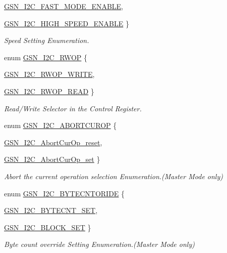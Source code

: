 \begin{DoxyCompactItemize}
\hyperlink{a00649_gga75fb1bfd3b52d6ceab35ff62418c6bf6a17def2de96abbf935f2575540969c799}{GSN\_\-I2C\_\-FAST\_\-MODE\_\-ENABLE}, 
\par
\hyperlink{a00649_gga75fb1bfd3b52d6ceab35ff62418c6bf6a1e00b42818c99439a7fc786bba97884f}{GSN\_\-I2C\_\-HIGH\_\-SPEED\_\-ENABLE}
 \}
\begin{DoxyCompactList}\small\item\em Speed Setting Enumeration. \end{DoxyCompactList}\item 
enum \hyperlink{a00649_ga67da6f46815f1aaf8cf6e1a35b13a02c}{GSN\_\-I2C\_\-RWOP} \{ \par
\hyperlink{a00649_gga67da6f46815f1aaf8cf6e1a35b13a02ca05670c9dbe8177c6b8181687371252b8}{GSN\_\-I2C\_\-RWOP\_\-WRITE}, 
\par
\hyperlink{a00649_gga67da6f46815f1aaf8cf6e1a35b13a02ca06637fe79ea8edf62c203c11c2cca718}{GSN\_\-I2C\_\-RWOP\_\-READ}
 \}
\begin{DoxyCompactList}\small\item\em Read/Write Selector in the Control Register. \end{DoxyCompactList}\item 
enum \hyperlink{a00649_ga2ed0e9ed554e26759140e9afffd51eb4}{GSN\_\-I2C\_\-ABORTCUROP} \{ \par
\hyperlink{a00649_gga2ed0e9ed554e26759140e9afffd51eb4ac5cf33d09a8a21ee470a61827adee434}{GSN\_\-I2C\_\-AbortCurOp\_\-reset}, 
\par
\hyperlink{a00649_gga2ed0e9ed554e26759140e9afffd51eb4af3c6cf457cfa893024d5cd527fe834ea}{GSN\_\-I2C\_\-AbortCurOp\_\-set}
 \}
\begin{DoxyCompactList}\small\item\em Abort the current operation selection Enumeration.(Master Mode only) \end{DoxyCompactList}\item 
enum \hyperlink{a00649_ga47ecffee533c3e8638337fb1c33feb17}{GSN\_\-I2C\_\-BYTECNTORIDE} \{ \par
\hyperlink{a00649_gga47ecffee533c3e8638337fb1c33feb17a04fb1c372ab6d5edce35268530fffae3}{GSN\_\-I2C\_\-BYTECNT\_\-SET}, 
\par
\hyperlink{a00649_gga47ecffee533c3e8638337fb1c33feb17a5467187f06dde3b3af5d8682eafb17ad}{GSN\_\-I2C\_\-BLOCK\_\-SET}
 \}
\begin{DoxyCompactList}\small\item\em Byte count override Setting Enumeration.(Master Mode only) \end{DoxyCompactList}\item 

\end{DoxyCompactItemize}
